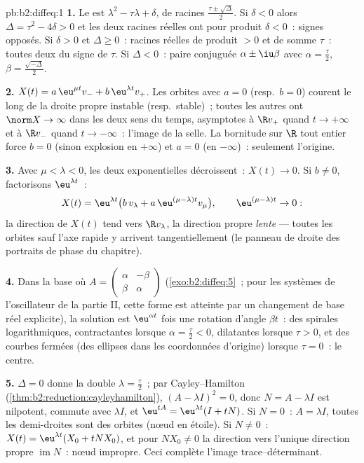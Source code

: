 \begin{solution}{pb:b2:diffeq:1}
\textbf{1.} Le  est $\lambda^2 -
\tau\lambda + \delta$, de racines
$\frac{\tau\pm\sqrt\Delta}{2}$. Si $\delta < 0$ alors $\Delta =
\tau^2 - 4\delta > 0$ et les deux racines réelles ont pour produit
$\delta < 0$~: signes opposés. Si $\delta > 0$ et $\Delta \geq
0$~: racines réelles de produit $> 0$ et de somme $\tau$~: toutes
deux du signe de $\tau$. Si $\Delta < 0$~: paire conjuguée $\alpha
\pm \iu\beta$ avec $\alpha = \frac\tau2$, $\beta =
\frac{\sqrt{-\Delta}}2$.

\textbf{2.} $X(t) = a\,\eu^{\mu t}v_- + b\,\eu^{\lambda t}v_+$.
Les orbites avec $a = 0$ (resp.\ $b = 0$) courent le long de la
droite propre instable (resp.\ stable)~; toutes les autres ont
$\norm X \to \infty$ dans les deux sens du temps, asymptotes à $\R
v_+$ quand $t \to +\infty$ et à $\R v_-$ quand $t \to -\infty$~:
l'image de la selle. La bornitude sur $\R$ tout entier force $b = 0$
(sinon explosion en $+\infty$) et $a = 0$ (en $-\infty$)~: seulement
l'origine.

\textbf{3.} Avec $\mu < \lambda < 0$, les deux exponentielles
décroissent~: $X(t) \to 0$. Si $b \neq 0$, factorisons
$\eu^{\lambda t}$~:
\[
X(t) = \eu^{\lambda t}\bigl(b\,v_\lambda + a\,\eu^{(\mu -
\lambda)t}v_\mu\bigr),
\qquad \eu^{(\mu-\lambda)t} \to 0 :
\]
la direction de $X(t)$ tend vers $\R v_\lambda$, la direction
propre \emph{lente} --- toutes les orbites sauf l'axe rapide y
arrivent tangentiellement (le panneau de droite des portraits de
phase du chapitre).

\textbf{4.} Dans la base où $A = \begin{pmatrix} \alpha &
-\beta\\ \beta & \alpha\end{pmatrix}$
(\cref{exo:b2:diffeq:5}~; pour les systèmes de l'oscillateur de la
partie II, cette forme est atteinte par un changement de base réel
explicite), la solution est $\eu^{\alpha t}$ fois une rotation
d'angle $\beta t$~: des spirales logarithmiques, contractantes
lorsque $\alpha = \frac\tau2 < 0$, dilatantes lorsque $\tau > 0$,
et des courbes fermées (des ellipses dans les coordonnées d'origine)
lorsque $\tau = 0$~: le centre.

\textbf{5.} $\Delta = 0$ donne la  double $\lambda =
\frac\tau2$~; par Cayley--Hamilton
(\cref{thm:b2:reduction:cayleyhamilton}), $(A - \lambda I)^2 =
0$, donc $N = A - \lambda I$ est nilpotent, commute avec
$\lambda I$, et $\eu^{tA} = \eu^{\lambda t}(I + tN)$. Si $N =
0$~: $A = \lambda I$, toutes les demi-droites sont des orbites
(nœud en étoile). Si $N \neq 0$~: $X(t) = \eu^{\lambda t}(X_0 +
tNX_0)$, et pour $NX_0 \neq 0$ la direction  vers l'unique
direction propre $\operatorname{im}N$~: nœud impropre. Ceci complète
l'image trace--déterminant.


\end{solution}
